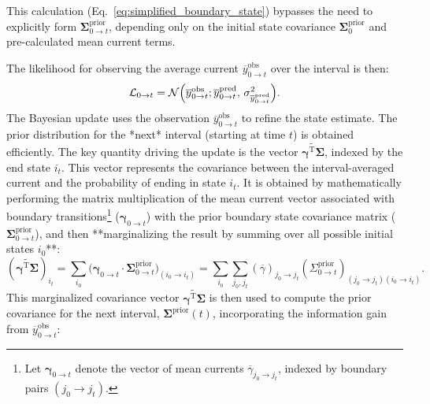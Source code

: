 \documentclass[pdflatex,sn-nature]{sn-jnl}%
\begin{document}
This calculation (Eq.~\ref{eq:simplified_boundary_state}) bypasses the need to explicitly form \( \boldsymbol{\Sigma}^{\text{prior}}_{0 \rightarrow t} \), depending only on the initial state covariance \( \boldsymbol{\Sigma}^{\text{prior}}_{0} \) and pre-calculated mean current terms.

The likelihood for observing the average current \( \overline{y}^{\text{obs}}_{0 \rightarrow t} \) over the interval is then:
\begin{equation}
\mathcal{L}_{0 \rightarrow t} = \mathcal{N}\Bigl( \overline{y}^{\text{obs}}_{0 \rightarrow t} ; \overline{y}^{\text{pred}}_{0 \rightarrow t},\, \sigma^2_{\overline{y}^{\text{pred}}_{0 \rightarrow t}} \Bigr).
\label{eq:macroIR_likelihood}
\end{equation}
The Bayesian update uses the observation \( \overline{y}^{\text{obs}}_{0 \rightarrow t} \) to refine the state estimate. The prior distribution for the *next* interval (starting at time \(t\)) is obtained efficiently. The key quantity driving the update is the vector \( \widetilde{\boldsymbol{\gamma}^{\mathrm{T}} \boldsymbol{\Sigma}} \), indexed by the end state \( i_t \). This vector represents the covariance between the interval-averaged current and the probability of ending in state \(i_t\). It is obtained by mathematically performing the matrix multiplication of the mean current vector associated with boundary transitions\footnote{Let \(\boldsymbol{\gamma}_{0 \rightarrow t}\) denote the vector of mean currents \( \overline{\gamma}_{j_0 \rightarrow j_t} \), indexed by boundary pairs \((j_0 \rightarrow j_t)\).} (\(\boldsymbol{\gamma}_{0 \rightarrow t}\)) with the prior boundary state covariance matrix (\(\boldsymbol{\Sigma}^{\text{prior}}_{0 \rightarrow t}\)), and then **marginalizing the result by summing over all possible initial states \( i_0 \)**:
\begin{equation}
	(\widetilde{\boldsymbol{\gamma}^{\mathrm{T}} \boldsymbol{\Sigma}})_{i_t} = \sum_{i_0} \Big( \boldsymbol{\gamma}_{0 \rightarrow t} \cdot \boldsymbol{\Sigma}^{\text{prior}}_{0 \rightarrow t} \Big)_{(i_0 \rightarrow i_t)} = \sum_{i_0} \sum_{j_0, j_t} (\overline{\gamma})_{j_0 \rightarrow j_t} (\Sigma^{\text{prior}}_{0 \rightarrow t})_{(j_0 \rightarrow j_t)(i_0 \rightarrow i_t)}. 
	\label{eq:interval_gamma_sigma_explained} %
\end{equation}
This marginalized covariance vector \( \widetilde{\boldsymbol{\gamma}^{\mathrm{T}} \boldsymbol{\Sigma}} \) is then used to compute the prior covariance for the next interval, \( \boldsymbol{\Sigma}^{\text{prior}}(t) \), incorporating the information gain from \( \overline{y}^{\text{obs}}_{0 \rightarrow t} \):
\end{document}

